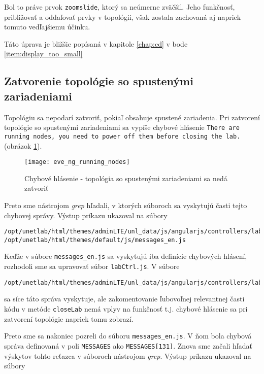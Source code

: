 Bol to práve prvok \texttt{zoomslide}, ktorý sa neúmerne zväčšil. Jeho funkčnosť, približovať a oddaľovať prvky v topológii, však zostala zachovaná aj napriek tomuto vedľajšiemu účinku.

Táto úprava je bližšie popísaná v kapitole \ref{chap:cd} v bode \ref{item:display_too_small}






\subsection{Zatvorenie topológie so spustenými zariadeniami}

Topológiu sa nepodarí zatvoriť, pokiaľ obsahuje spustené zariadenia. Pri zatvorení topológie so spustenými zariadeniami sa vypíše chybové hlásenie \texttt{There are running nodes, you need to power off them before closing the lab.} (obrázok \ref{obr:eve_ng_running_nodes}).

\begin{figure}
    \centering
    \texttt{[image: eve\_ng\_running\_nodes]}
    \caption{Chybové hlásenie - topológia so spustenými zariadeniami sa nedá zatvoriť}
    \label{obr:eve_ng_running_nodes}
\end{figure}

Preto sme nástrojom \emph{grep} hľadali, v ktorých súboroch sa vyskytujú časti tejto chybovej správy. Výstup príkazu ukazoval na súbory

\begin{Verbatim}[samepage=true]
/opt/unetlab/html/themes/adminLTE/unl_data/js/angularjs/controllers/lab/labCtrl.js
/opt/unetlab/html/themes/default/js/messages_en.js
\end{Verbatim}

Keďže v súbore \texttt{messages\_en.js} sa vyskytujú iba definície chybových hlásení, rozhodoli sme sa upravovať súbor \texttt{labCtrl.js}. V súbore

\begin{Verbatim}[samepage=true]
/opt/unetlab/html/themes/adminLTE/unl_data/js/angularjs/controllers/lab/labCtrl.js
\end{Verbatim}

sa síce táto správa vyskytuje, ale zakomentovanie ľubovoľnej relevantnej časti kódu v metóde \texttt{closeLab} nemá vplyv na funkčnosť t.j. chybové hlásenie sa pri zatvorení topológie napriek tomu zobrazí.

Preto sme sa nakoniec pozreli do súboru \texttt{messages\_en.js}. V ňom bola chybová správa definovaná v poli \texttt{MESSAGES} ako \texttt{MESSAGES[131]}. Znova sme začali hľadať výskytov tohto reťazca v súboroch nástrojom \emph{grep}. Výstup príkazu ukazoval na súbory

